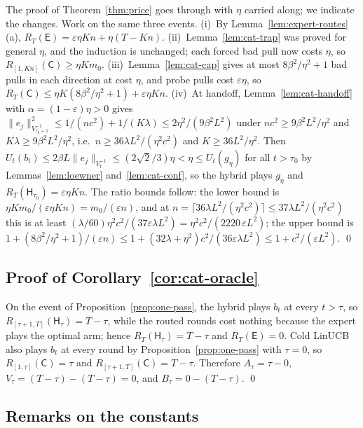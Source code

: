 \documentclass{article}
\theoremstyle{definition}
\theoremstyle{remark}
\newcommand{\eps}{\varepsilon}
\theoremstyle{remark}
\newcommand{\Cold}{\mathsf{C}}
\newcommand{\Exp}{\mathsf{E}}
\newcommand{\Hyb}{\mathsf{H}}
\begin{document}
The proof of Theorem~\ref{thm:price} goes through with $\eta$ carried along;
we indicate the changes. Work on the same three events. (i)~By
Lemma~\ref{lem:expert-routes}(a), $R_T(\Exp)=\eps\eta Kn+\eta(T-Kn)$.
(ii)~Lemma~\ref{lem:cat-trap} was proved for general $\eta$, and the induction
is unchanged; each forced bad pull now costs $\eta$, so
$R_{[1,Kn]}(\Cold)\ge\eta Km_0$. (iii)~Lemma~\ref{lem:cat-cap} gives at most
$8\beta^2/\eta^2+1$ bad pulls in each direction at cost $\eta$, and probe pulls
cost $\eps\eta$, so $R_T(\Cold)\le\eta K(8\beta^2/\eta^2+1)+\eps\eta Kn$.
(iv)~At handoff, Lemma~\ref{lem:cat-handoff} with $\alpha=(1-\eps)\eta>0$ gives
$\|e_j\|^2_{V_{\tau_0+1}^{-1}}\le1/(nc^2)+1/(K\lambda)\le2\eta^2/(9\beta^2L^2)$ under
$nc^2\ge9\beta^2L^2/\eta^2$ and $K\lambda\ge9\beta^2L^2/\eta^2$, i.e.\ $n\ge36\lambda L^2/(\eta^2c^2)$
and $K\ge36L^2/\eta^2$. Then $U_t(b_t)\le2\beta L\|e_j\|_{V_t^{-1}}\le(2\sqrt2/3)\eta<\eta\le U_t(g_\eta)$
for all $t>\tau_0$ by Lemmas~\ref{lem:loewner} and~\ref{lem:cat-conf}, so the
hybrid plays $g_\eta$ and $R_T(\Hyb_{\tau_0})=\eps\eta Kn$. The ratio bounds
follow: the lower bound is $\eta Km_0/(\eps\eta Kn)=m_0/(\eps n)$, and at
$n=\lceil36\lambda L^2/(\eta^2c^2)\rceil\le37\lambda L^2/(\eta^2c^2)$ this is at least
$(\lambda/60)\eta^2c^2/(37\eps\lambda L^2)=\eta^2c^2/(2220\,\eps L^2)$; the upper bound
is $1+(8\beta^2/\eta^2+1)/(\eps n)\le1+(32\lambda+\eta^2)c^2/(36\eps\lambda L^2)\le1+c^2/(\eps L^2)$. \qed

\subsection{Proof of Corollary~\ref{cor:cat-oracle}}

On the event of Proposition~\ref{prop:one-pass}, the hybrid plays $b_t$ at
every $t>\tau$, so $R_{[\tau+1,T]}(\Hyb_\tau)=T-\tau$, while the routed rounds
cost nothing because the expert plays the optimal arm; hence
$R_T(\Hyb_\tau)=T-\tau$ and $R_T(\Exp)=0$. Cold LinUCB also plays $b_t$ at
every round by Proposition~\ref{prop:one-pass} with $\tau=0$, so
$R_{[1,\tau]}(\Cold)=\tau$ and $R_{[\tau+1,T]}(\Cold)=T-\tau$. Therefore
$A_\tau=\tau-0$, $V_\tau=(T-\tau)-(T-\tau)=0$, and $B_\tau=0-(T-\tau)$. \qed

\subsection{Remarks on the constants}
\end{document}
